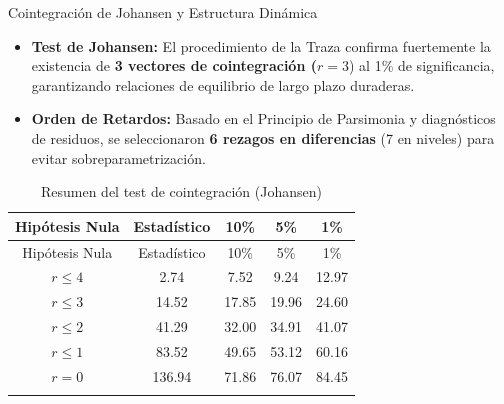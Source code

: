 \documentclass[
  10pt,
  ignorenonframetext,
  aspectratio=169,
  spanish,
]{beamer}
\providecommand{\tightlist}{%
  \setlength{\itemsep}{0pt}\setlength{\parskip}{0pt}}
\begin{document}
\begin{frame}{Cointegración de Johansen y Estructura Dinámica}
\protect{}\label{cointegraciuxf3n-de-johansen-y-estructura-dinuxe1mica}
\begin{itemize}
\tightlist
\item
  \textbf{Test de Johansen:} El procedimiento de la Traza confirma
  fuertemente la existencia de \textbf{3 vectores de cointegración
  (}\(r=3\)) al 1\% de significancia, garantizando relaciones de
  equilibrio de largo plazo duraderas.
\item
  \textbf{Orden de Retardos:} Basado en el Principio de Parsimonia y
  diagnósticos de residuos, se seleccionaron \textbf{6 rezagos en
  diferencias} (7 en niveles) para evitar sobreparametrización.
\end{itemize}

\begin{longtable}[]{@{}ccccc@{}}
\caption{Resumen del test de cointegración
(Johansen)}\label{tbl-johansen}\tabularnewline
\toprule\noalign{}
Hipótesis Nula & Estadístico & 10\% & 5\% & 1\% \\
\midrule\noalign{}
\endfirsthead
\toprule\noalign{}
Hipótesis Nula & Estadístico & 10\% & 5\% & 1\% \\
\midrule\noalign{}
\endhead
\(r \leq 4\) & 2.74 & 7.52 & 9.24 & 12.97 \\
\(r \leq 3\) & 14.52 & 17.85 & 19.96 & 24.60 \\
\(r \leq 2\) & 41.29 & 32.00 & 34.91 & 41.07 \\
\(r \leq 1\) & 83.52 & 49.65 & 53.12 & 60.16 \\
\(r = 0\) & 136.94 & 71.86 & 76.07 & 84.45 \\
\bottomrule\noalign{}
\end{longtable}
\end{frame}
\end{document}
